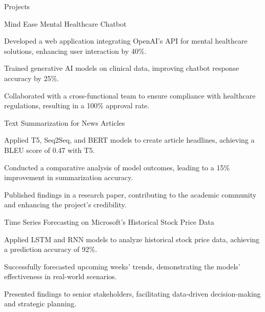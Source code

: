 \documentclass{resume} %
\begin{document}
    \begin{rSection}{Projects}
                    \begin{rSubsection}
                                    {Mind Ease Mental Healthcare Chatbot}
                                {}{}{}
                                    \item Developed a web application integrating OpenAI's API for mental healthcare solutions, enhancing user interaction by 40\%.
                                    \item Trained generative AI models on clinical data, improving chatbot response accuracy by 25\%.
                                    \item Collaborated with a cross{-}functional team to ensure compliance with healthcare regulations, resulting in a 100\% approval rate.
                            \end{rSubsection}
                    \begin{rSubsection}
                                    {Text Summarization for News Articles}
                                {}{}{}
                                    \item Applied T5, Seq2Seq, and BERT models to create article headlines, achieving a BLEU score of 0.47 with T5.
                                    \item Conducted a comparative analysis of model outcomes, leading to a 15\% improvement in summarization accuracy.
                                    \item Published findings in a research paper, contributing to the academic community and enhancing the project's credibility.
                            \end{rSubsection}
                    \begin{rSubsection}
                                    {Time Series Forecasting on Microsoft's Historical Stock Price Data}
                                {}{}{}
                                    \item Applied LSTM and RNN models to analyze historical stock price data, achieving a prediction accuracy of 92\%.
                                    \item Successfully forecasted upcoming weeks' trends, demonstrating the models' effectiveness in real{-}world scenarios.
                                    \item Presented findings to senior stakeholders, facilitating data{-}driven decision{-}making and strategic planning.
                            \end{rSubsection}
            \end{rSection}
\end{document}
